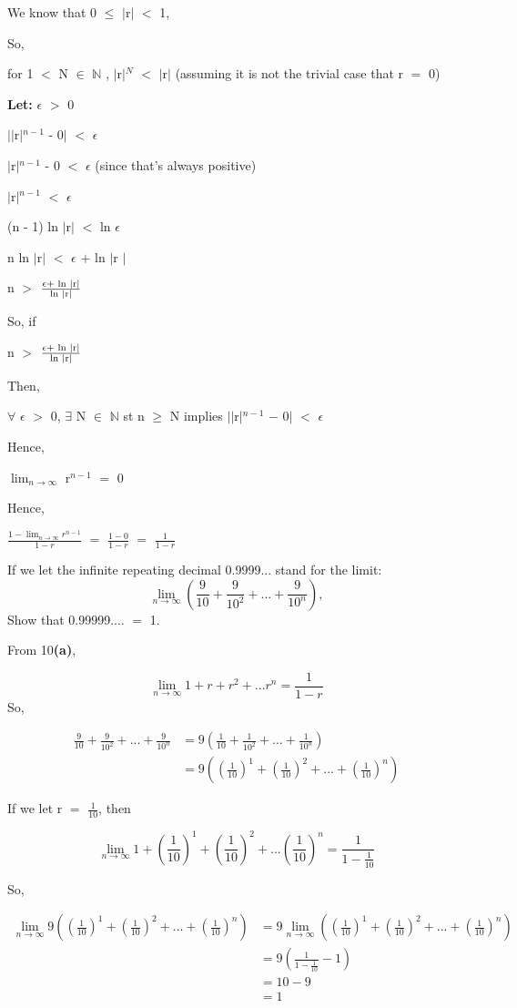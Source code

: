 \documentclass{article}
\newcommand{\mt}[1]{\ensuremath{#1}}
\newcommand{\lt}[1]{\textbf{Let: } #1}
\newcommand{\bpth}[1]{\textbf{(#1)}}
\newcommand{\bn}{\mt{\mathbb{N}} }       %
\newcommand{\ep}{\mt{\epsilon} }         %
\newcommand{\fa}{\mt{\forall} }          %
\newcommand{\mem}{\mt{\in} }
\newcommand{\exs}{\mt{\exists} }
\newcommand{\av}[1]{\mt{|}#1\mt{|}}  %
\newcommand{\ps}{\mt{+} }
\newcommand{\ms}{\mt{-} }
\newcommand{\ls}{\mt{<} }
\newcommand{\gr}{\mt{>} }
\newcommand{\lse}{\mt{\leq} }
\newcommand{\gre}{\mt{\geq} }
\newcommand{\eql}{\mt{=} }
\newcommand{\frc}[2]{\mt{\frac{#1}{#2}}}
\newcommand{\lmti}[1]{\mt{\displaystyle{\lim_{#1 \to \infty}}}}
\newcommand{\eqn}[1]{\[#1\]}
\newcommand{\splt}[1]{\begin{split}#1\end{split}}
\begin{document}
{{	We know that 0 \lse \av{r} \ls 1,
	
	So,
	
	for 1 \ls N \mem \bn, \av{r}$^N$ \ls \av{r} (assuming it is not the trivial case that r \eql 0)
	
	\lt{\ep \gr 0}
	
	\av{\av{r}$^{n-1}$ - 0} \ls \ep
	
	\av{r}$^{n-1}$ - 0 \ls \ep (since that's always positive)
	
	\av{r}$^{n-1}$ \ls \ep
	
	(n - 1) ln \av{r} \ls ln \ep
	
	n ln \av{r} \ls \ep \ps ln \av{r	}
	
	n \gr \frc{\ep + \textrm{ ln \av{r}}}{\textrm{ln \av{r}}}
	
	So, if 
	
	n \gr \frc{\ep + \textrm{ ln \av{r}}}{\textrm{ln \av{r}}}
	
	Then, 
	
	\fa \ep \gr 0, \exs N \mem \bn st n \gre N implies \av{\av{r}$^{n-1}$ \ms 0} \ls \ep
	
	Hence, 
	
	\lmti{n} r$^{n - 1}$ \eql 0
	
	Hence,
	
	\frc{1 - \lmti{n} r^{n - 1}}{1 - r} \eql \frc{1 - 0}{1 - r} \eql \frc{1}{1 - r}
	
\item If we let the infinite repeating decimal 0.9999... stand for the limit:
\eqn{\lmti{n}(\frac{9}{10} + \frac{9}{10^2} + ... + \frac{9}{10^n}),}
	Show that 0.99999.... \eql 1.

	From 10\bpth{a},
	
\eqn{\lmti{n} 1 + r + r^2 + ... r^n \eql \frc{1}{1 - r}}
So,

\eqn{
	\splt{
		\frac{9}{10} + \frac{9}{10^2} + ... + \frac{9}{10^n} & = 9(\frac{1}{10} + \frac{1}{10^2} + ... + \frac{1}{10^n}) \\
		& =  9((\frc{1}{10})^{1} + (\frc{1}{10})^{2} + ... + (\frc{1}{10})^{n})
	}
}

If we let r \eql \frc{1}{10}, then

\eqn{\lmti{n} 1 + (\frc{1}{10})^1 + (\frc{1}{10})^2 + ... (\frc{1}{10})^n = \frc{1}{1 - \frc{1}{10}}}

So,

\eqn{
	\splt{
		\lmti{n} 9((\frc{1}{10})^{1} + (\frc{1}{10})^{2} + ... + (\frc{1}{10})^{n}) & = 9 \lmti{n}((\frc{1}{10})^{1} + (\frc{1}{10})^{2} + ... + (\frc{1}{10})^{n}) \\
		& = 9 (\frac{1}{1 - \frac{1}{10}} - 1) \\
		& = 10 - 9 \\
		& = 1
	}
}

}}
\end{document}
